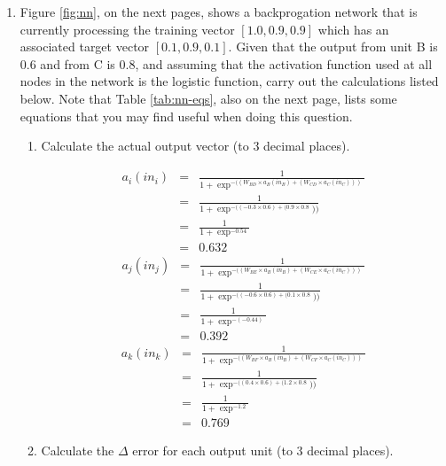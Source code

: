 \documentclass[--SOLUTION-OPTION--]{ditpaper}
\begin{document}
\begin{enumerate}
		\item Figure \ref{fig:nn}, on the next pages, shows a backprogation network that is currently processing the training vector $[1.0, 0.9, 0.9]$ which has an  associated target vector $[0.1, 0.9, 0.1]$. Given that the output from unit B is $0.6$ and from C is $0.8$, and assuming that the activation function used at all nodes in the network is the logistic function, carry out the calculations listed below. Note that Table \ref{tab:nn-eqs}, also on the next page, lists some equations that you may find useful when doing this question. 
\begin{enumerate}
	\item Calculate the actual output vector (to 3 decimal places).
		\begin{answer}
		\begin{eqnarray*}
		a_i(in_i) &=&\frac{1}{1 + \exp^{- ((W_{BD} \times a_B(in_B) + (W_{CD} \times a_C(in_C) ))}}\\
		&=&\frac{1}{1 + \exp^{- ((-0.3 \times 0.6) + (0.9 \times 0.8}))}\\
		&=&\frac{1}{1 + \exp^{- 0.54}}\\
		&=&0.632
		\end{eqnarray*}
		\begin{eqnarray*}
		a_j(in_j) &=&\frac{1}{1 + \exp^{- ((W_{BE} \times a_B(in_B) + (W_{CE} \times a_C(in_C) ))}}\\
		& = &\frac{1}{1 + \exp^{- ((-0.6 \times 0.6) + (0.1 \times 0.8}))}\\
		& = &\frac{1}{1 + \exp^{- (-0.44)}}\\
		& = &0.392
		\end{eqnarray*}
		\begin{eqnarray*}
		a_k(in_k) &=&\frac{1}{1 + \exp^{- ((W_{BF} \times a_B(in_B) + (W_{CF} \times a_C(in_C) ))}}\\
		& = &\frac{1}{1 + \exp^{- ((0.4 \times 0.6) + (1.2 \times 0.8}))}\\
		& = &\frac{1}{1 + \exp^{- 1.2}}\\
		& = &0.769
		\end{eqnarray*}
		\end{answer}
	\item Calculate the \textbf{$\Delta$} error for each output unit (to 3 decimal places).

\end{enumerate}
\end{enumerate}
\end{document}
